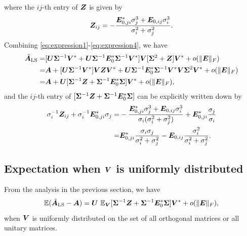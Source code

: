 where the $ij$-th entry of $\bZ$ is given by \[
\bZ_{ij}=-\frac{\bE_{0,ji}^*\sigma_j^3+\bE_{0,ij}\sigma_i^3}{\sigma_i^2+\sigma_j^2}.
\]
Combining \eqref{eq:expression1}-\eqref{eq:expression4}, we have
\begin{align}
\nonumber\hat{\bA}_{\text{LS}}=&[\bU\bSigma^{-1}\bV^* +\bU\bSigma^{-1}\bE_0^*\bSigma^{-1}\bV^*] \bV[\bSigma^2 + \bZ]\bV^* +o(\|\bE\|_F)
\\\nonumber=&\bA + [\bU\bSigma^{-1}\bV^*]\bV\bZ\bV^*+\bU\bSigma^{-1}\bE_0^*\bSigma^{-1}\bV^*\bV \bSigma^2 \bV^*+o(\|\bE\|_F)
\\
=&\bA+\bU[\bSigma^{-1}\bZ+\bSigma^{-1}\bE_0^*\bSigma]\bV^*+o(\|\bE\|_F),
\label{eq:expression5}\end{align}
and the $ij$-th entry of $[\bSigma^{-1}\bZ+\bSigma^{-1}\bE_0^*\bSigma]$ can be explicitly written down by
\begin{align*}
\sigma_i^{-1}\bZ_{ij}+\sigma_i^{-1}\bE_{0,ji}^*\sigma_j
=&-\frac{\bE_{0,ji}^*\sigma_j^3+\bE_{0,ij}\sigma_i^3}{\sigma_i(\sigma_i^2+\sigma_j^2)}+\bE_{0,ji}^*\frac{\sigma_j}{\sigma_i}
\\=&\bE_{0,ji}^*\frac{\sigma_i\sigma_j}{\sigma_i^2+\sigma_j^2}-\bE_{0,ij}\frac{\sigma_i^2}{\sigma_i^2+\sigma_j^2}.
\end{align*}


\subsection{Expectation when $\bV$ is uniformly distributed}
From the analysis in the previous section, we have
\[
\Expect(\hat{\bA}_{\text{LS}}-\bA)=\bU\,\Expect_{\bV}[\bSigma^{-1}\bZ+\bSigma^{-1}\bE_0^*\bSigma]\bV^*+o(\|\bE\|_F),
\]
when $\bV$ is uniformly distributed on the set of all orthogonal matrices or all unitary matrices.

